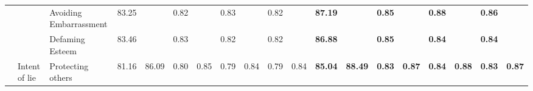 \begin{table}[!tbh]
{\begin{tabular}{l|l|l|llllllll||llllllll}
                                                                                               &                                  & Avoiding Embarrassment   & \multicolumn{1}{l|}{83.25} & \multicolumn{1}{l|}{}                        & \multicolumn{1}{l|}{0.82} & \multicolumn{1}{l|}{}                       & \multicolumn{1}{l|}{0.83} & \multicolumn{1}{l|}{}                       & \multicolumn{1}{l|}{0.82} &                        & \multicolumn{1}{l|}{\cellcolor[HTML]{FFFE65}\textbf{87.19}} & \multicolumn{1}{l|}{\cellcolor[HTML]{FFFE65}}                                 & \multicolumn{1}{l|}{\cellcolor[HTML]{FFFE65}\textbf{0.85}} & \multicolumn{1}{l|}{\cellcolor[HTML]{FFFE65}}                                & \multicolumn{1}{l|}{\cellcolor[HTML]{FFFE65}\textbf{0.88}} & \multicolumn{1}{l|}{\cellcolor[HTML]{FFFE65}}                                & \multicolumn{1}{l|}{\cellcolor[HTML]{FFFE65}\textbf{0.86}} & \cellcolor[HTML]{FFFE65}                                \\ \cline{3-4} \cline{6-6} \cline{8-8} \cline{10-10} \cline{12-12} \cline{14-14} \cline{16-16} \cline{18-18}
                                                                                               &                                  & Defaming Esteem          & \multicolumn{1}{l|}{83.46} & \multicolumn{1}{l|}{}                        & \multicolumn{1}{l|}{0.83} & \multicolumn{1}{l|}{}                       & \multicolumn{1}{l|}{0.82} & \multicolumn{1}{l|}{}                       & \multicolumn{1}{l|}{0.82} &                        & \multicolumn{1}{l|}{\cellcolor[HTML]{FFFE65}\textbf{86.88}} & \multicolumn{1}{l|}{\cellcolor[HTML]{FFFE65}}                                 & \multicolumn{1}{l|}{\cellcolor[HTML]{FFFE65}\textbf{0.85}} & \multicolumn{1}{l|}{\cellcolor[HTML]{FFFE65}}                                & \multicolumn{1}{l|}{\cellcolor[HTML]{FFFE65}\textbf{0.84}} & \multicolumn{1}{l|}{\cellcolor[HTML]{FFFE65}}                                & \multicolumn{1}{l|}{\cellcolor[HTML]{FFFE65}\textbf{0.84}} & \cellcolor[HTML]{FFFE65}                                \\ \cline{3-4} \cline{6-6} \cline{8-8} \cline{10-10} \cline{12-12} \cline{14-14} \cline{16-16} \cline{18-18}
                                                                                               & \multirow{-6}{*}{Intent of lie}  & Protecting others        & \multicolumn{1}{l|}{81.16} & \multicolumn{1}{l|}{\multirow{-6}{*}{86.09}} & \multicolumn{1}{l|}{0.80} & \multicolumn{1}{l|}{\multirow{-6}{*}{0.85}} & \multicolumn{1}{l|}{0.79} & \multicolumn{1}{l|}{\multirow{-6}{*}{0.84}} & \multicolumn{1}{l|}{0.79} & \multirow{-6}{*}{0.84} & \multicolumn{1}{l|}{\cellcolor[HTML]{FFFE65}\textbf{85.04}} & \multicolumn{1}{l|}{\multirow{-6}{*}{\cellcolor[HTML]{FFFE65}\textbf{88.49}}} & \multicolumn{1}{l|}{\cellcolor[HTML]{FFFE65}\textbf{0.83}} & \multicolumn{1}{l|}{\multirow{-6}{*}{\cellcolor[HTML]{FFFE65}\textbf{0.87}}} & \multicolumn{1}{l|}{\cellcolor[HTML]{FFFE65}\textbf{0.84}} & \multicolumn{1}{l|}{\multirow{-6}{*}{\cellcolor[HTML]{FFFE65}\textbf{0.88}}} & \multicolumn{1}{l|}{\cellcolor[HTML]{FFFE65}\textbf{0.83}} & \multirow{-6}{*}{\cellcolor[HTML]{FFFE65}\textbf{0.87}} \\ \cline{2-19} 

\end{tabular}}
\end{table}
